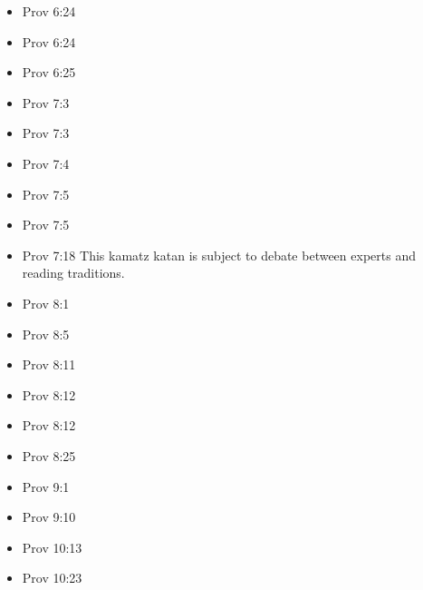 \documentclass[14pt]{book}
\begin{document}
\begin{multicols}{2}
\begin{itemize}
									\item Prov 6:24
									
									\item Prov 6:24
									
									\item Prov 6:25
									
									\item Prov 7:3
									
									\item Prov 7:3
									
									\item Prov 7:4
									
									\item Prov 7:5
									
									\item Prov 7:5
									
									\item Prov 7:18 This kamatz katan is subject to debate between experts and reading traditions.
									
									\item Prov 8:1
									
									\item Prov 8:5
									
									\item Prov 8:11
									
									\item Prov 8:12
									
									\item Prov 8:12
									
									\item Prov 8:25
									
									\item Prov 9:1
									
									\item Prov 9:10
									
									\item Prov 10:13
									
									\item Prov 10:23
									

\end{itemize}
\end{multicols}
\end{document}
